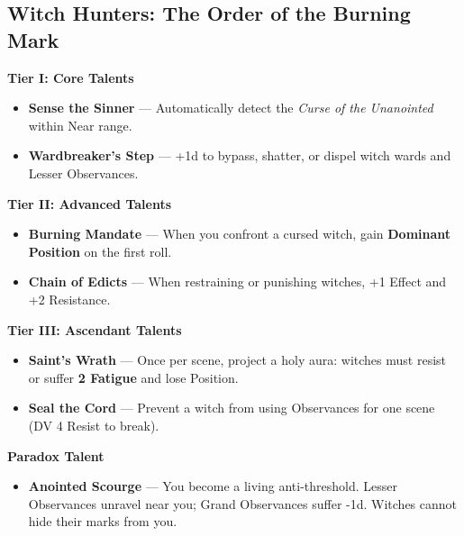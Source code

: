 \documentclass[11pt]{book}
\begin{document}
\subsection*{Witch Hunters: The Order of the Burning Mark}

\begin{tcolorbox}[colback=flame!5,colframe=flame!60!black,
title={\textbf{Order of the Burning Mark} --- Talents}]

\textbf{Tier I: Core Talents}
\begin{itemize}[noitemsep,leftmargin=1.5em]
    \item \textbf{Sense the Sinner} ---  
    Automatically detect the \emph{Curse of the Unanointed} within Near range.

    \item \textbf{Wardbreaker's Step} ---  
    +1d to bypass, shatter, or dispel witch wards and Lesser Observances.
\end{itemize}

\textbf{Tier II: Advanced Talents}
\begin{itemize}[noitemsep,leftmargin=1.5em]
    \item \textbf{Burning Mandate} ---  
    When you confront a cursed witch, gain \textbf{Dominant Position} on the first roll.

    \item \textbf{Chain of Edicts} ---  
    When restraining or punishing witches, +1 Effect and +2 Resistance.
\end{itemize}

\textbf{Tier III: Ascendant Talents}
\begin{itemize}[noitemsep,leftmargin=1.5em]
    \item \textbf{Saint's Wrath} ---  
    Once per scene, project a holy aura: witches must resist or suffer \textbf{2 Fatigue} and lose Position.

    \item \textbf{Seal the Cord} ---  
    Prevent a witch from using Observances for one scene (DV 4 Resist to break).
\end{itemize}

\textbf{Paradox Talent}
\begin{itemize}[noitemsep,leftmargin=1.5em]
    \item \textbf{Anointed Scourge} ---  
    You become a living anti-threshold.  
    Lesser Observances unravel near you; Grand Observances suffer -1d.  
    Witches cannot hide their marks from you.
\end{itemize}

\end{tcolorbox}
\end{document}

